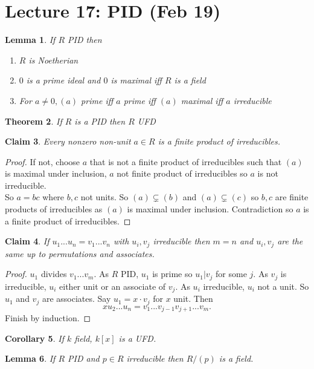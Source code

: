 \documentclass[a4paper,12pt]{article}
\newtheorem{thm}{Theorem}[section]
\newtheorem{lem}[thm]{Lemma}
\newtheorem{cor}[thm]{Corollary}
\newtheorem{claim}[thm]{Claim}
\begin{document}
\section{Lecture 17: PID (Feb 19)}
\begin{lem}
    If $R$ PID then 
    \begin{enumerate}
        \item $R$ is Noetherian
        \item $0$ is a prime ideal and $0$ is maximal iff $R$ is a field
        \item For $a\neq 0, (a)$ prime iff $a$ prime iff $(a)$ maximal iff $a$ irreducible
    \end{enumerate}
\end{lem}
\begin{thm}
    If $R$ is a PID then $R$ UFD
\end{thm}
\begin{claim}
    Every nonzero non-unit $a\in R$ is a finite product of irreducibles.
\end{claim}
\begin{proof}
    If not, choose $a$ that is not a finite product of irreducibles such that $(a)$ is maximal under inclusion, $a$ not finite product of irreducibles so $a$ is not irreducible. \\
    So $a=bc$ where $b,c$ not units. So $(a)\subsetneq (b)$ and $(a)\subsetneq (c)$ so $b,c$ are finite products of irreducibles as $(a)$ is maximal under inclusion. Contradiction so $a$ is a finite product of irreducibles. 
\end{proof}
\begin{claim}
    If $u_1...u_n=v_1...v_n$ with $u_i,v_j$ irreducible then $m=n$ and $u_i,v_j$ are the same up to permutations and associates. 
\end{claim}
\begin{proof}
    $u_1$ divides $v_1...v_m$. As $R$ PID, $u_1$ is prime so $u_1 | v_j$ for some $j$. As $v_j$ is irreducible, $u_i$ either unit or an associate of $v_j$. As $u_i$ irreducible, $u_i$ not a unit. So $u_1$ and $v_j$ are associates. Say $u_1=x\cdot v_j$ for $x$ unit. Then \[
    x u_2 ... u_n=v_1...v_{j-1}v_{j+1}...v_m
    .\] 
    Finish by induction. 
\end{proof}
\begin{cor}
    If $k$ field, $k[x]$ is a UFD. 
\end{cor}
\begin{lem}
    If $R$ PID and $p\in R$ irreducible then $R/(p)$ is a field. 
\end{lem}
\end{document}
